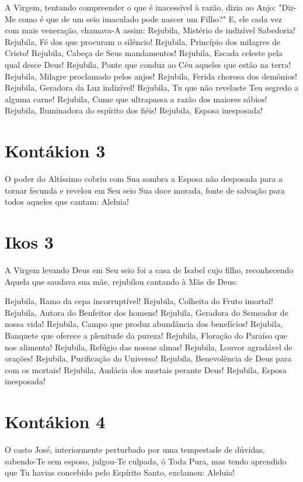 \documentclass{subfiles}
\begin{document}
A Virgem, tentando compreender o que é inacessível à razão, dizia ao
Anjo: "Diz-Me como é que de um seio imaculado pode nascer um Filho?" E, ele
cada vez com mais veneração, chamava-A assim:
Rejubila, Mistério de indizível Sabedoria!
Rejubila, Fé dos que procuram o silêncio!
Rejubila, Princípio dos milagres de Cristo!
Rejubila, Cabeça de Seus mandamentos!
Rejubila, Escada celeste pela qual desce Deus!
Rejubila, Ponte que conduz ao Céu aqueles que estão na terra!
Rejubila, Milagre proclamado pelos anjos!
Rejubila, Ferida chorosa dos demônios!
Rejubila, Geradora da Luz indizível!
Rejubila, Tu que não revelaste Teu segredo a alguma carne!
Rejubila, Cume que ultrapassa a razão dos maiores sábios!
Rejubila, Iluminadora do espírito dos fiéis!
Rejubila, Esposa inesposada!

\section*{Kontákion 3}

O poder do Altíssimo cobriu com Sua sombra a Esposa não desposada
para a tornar fecunda e revelou em Seu seio Sua doce morada, fonte de
salvação para todos aqueles que cantam: Aleluia!

\section*{Ikos 3}

A Virgem levando Deus em Seu seio foi a casa de Isabel cujo filho,
reconhecendo Aquela que saudava sua mãe, rejubilou cantando à Mãe de
Deus:

Rejubila, Ramo da cepa incorruptível!
Rejubila, Colheita do Fruto imortal!
Rejubila, Autora do Benfeitor dos homens!
Rejubila, Geradora do Semeador de nossa vida!
Rejubila, Campo que produz abundância dos benefícios!
Rejubila, Banquete que oferece a plenitude da pureza!
Rejubila, Floração do Paraíso que nos alimenta!
Rejubila, Refúgio das nossas almas!
Rejubila, Louvor agradável de orações!
Rejubila, Purificação do Universo!
Rejubila, Benevolência de Deus para com os mortais!
Rejubila, Audácia dos mortais perante Deus!
Rejubila, Esposa inesposada!

\section*{Kontákion 4}

O casto José, interiormente perturbado por uma tempestade de
dúvidas, sabendo-Te sem esposo, julgou-Te culpada, ó Toda Pura, mas tendo
aprendido que Tu havias concebido pelo Espírito Santo, exclamou: Aleluia!
\end{document}
